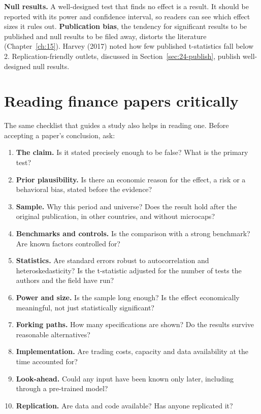 \textbf{Null results.} A well-designed test that finds no effect is a result. It should be reported with its power and confidence interval, so readers can see which effect sizes it rules out. \textbf{Publication bias}, the tendency for significant results to be published and null results to be filed away, distorts the literature (Chapter~\ref{ch:15}). Harvey (2017) noted how few published t-statistics fall below 2. Replication-friendly outlets, discussed in Section~\ref{sec:24-publish}, publish well-designed null results.

\section{Reading finance papers critically}
\label{sec:24-reading}

The same checklist that guides a study also helps in reading one. Before accepting a paper's conclusion, ask:

\begin{enumerate}
  \item \textbf{The claim.} Is it stated precisely enough to be false? What is the primary test?
  \item \textbf{Prior plausibility.} Is there an economic reason for the effect, a risk or a behavioral bias, stated before the evidence?
  \item \textbf{Sample.} Why this period and universe? Does the result hold after the original publication, in other countries, and without microcaps?
  \item \textbf{Benchmarks and controls.} Is the comparison with a strong benchmark? Are known factors controlled for?
  \item \textbf{Statistics.} Are standard errors robust to autocorrelation and heteroskedasticity? Is the t-statistic adjusted for the number of tests the authors and the field have run?
  \item \textbf{Power and size.} Is the sample long enough? Is the effect economically meaningful, not just statistically significant?
  \item \textbf{Forking paths.} How many specifications are shown? Do the results survive reasonable alternatives?
  \item \textbf{Implementation.} Are trading costs, capacity and data availability at the time accounted for?
  \item \textbf{Look-ahead.} Could any input have been known only later, including through a pre-trained model?
  \item \textbf{Replication.} Are data and code available? Has anyone replicated it?
\end{enumerate}

